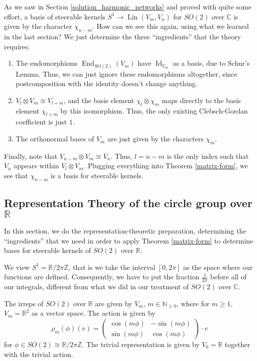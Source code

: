 \documentclass[12pt, a4paper]{article}
\theoremstyle{plain}
\theoremstyle{definition}
\theoremstyle{remark}
\newcommand{\N}{\mathds{N}}
\newcommand{\Z}{\mathds{Z}}
\newcommand{\R}{\mathds{R}}
\newcommand{\C}{\mathds{C}}
\DeclareMathOperator{\lin}{Lin}
\DeclareMathOperator{\End}{End}
\DeclareMathOperator{\Id}{Id}
\begin{document}
As we saw in Section \ref{solution_harmonic_networks} and proved with quite some effort, a basis of steerable kernels $S^1 \to \lin(V_m, V_n)$ for $SO(2)$ over $\C$ is given by the character $\chi_{n-m}$. How can we see this again, using what we learned in the last section? We just determine the three ``ingredients'' that the theory requires:
\begin{enumerate}
\item The endomorphisms $\End_{SO(2)}(V_m)$ have $\Id_{V_m}$ as a basis, due to Schur's Lemma. Thus, we can just ignore these endomorphisms altogether, since postcomposition with the identity doesn't change anything.
\item $V_l \otimes V_m \cong V_{l+m}$, and the basis element $\chi_l \otimes \chi_m$ maps directly to the basis element $\chi_{l+m}$ by this isomorphism. Thus, the only existing Clebsch-Gordan coefficient is just $1$.
\item The orthonormal bases of $V_m$ are just given by the characters $\chi_m$.
\end{enumerate}
Finally, note that $V_{n-m} \otimes V_m \cong V_n$. Thus, $l = n-m$ is the only index such that $V_n$ appears within $V_l \otimes V_m$. Plugging everything into Theorem \ref{matrix-form}, we see that $\chi_{n-m}$ is a basis for steerable kernels.



\subsection{Representation Theory of the circle group over $\R$}

In this section, we do the representation-theoretic preparation, determining the ``ingredients'' that we need in order to apply Theorem \ref{matrix-form} to determine bases for steerable kernels of $SO(2)$ over $\R$. 

We view $S^1 = \R/{2 \pi \Z}$, that is we take the interval $[0, 2 \pi]$ as the space where our functions are defined. Consequently, we have to put the fraction $\frac{1}{2 \pi}$ before all of our integrals, different from what we did in our treatment of $SO(2)$ over $\C$.

The irreps of $SO(2)$ over $\R$ are given by $V_m$, $m \in \N_{\geq 0}$, where for $m \geq 1$, $V_m = \R^2$ as a vector space. The action is given by
\begin{equation*}
\rho_m(\phi)(v) =
\begin{pmatrix}
\cos(m \phi) & -\sin(m \phi) \\
\sin(m \phi) & \cos(m \phi)
\end{pmatrix} \cdot v
\end{equation*}
for $\phi \in SO(2) \cong \R/{2 \pi \Z}$. The trivial representation is given by $V_0 = \R$ together with the trivial action.
\end{document}
